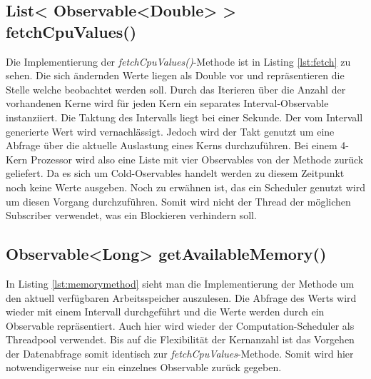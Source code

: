 \subsection{List< Observable<Double> > fetchCpuValues()}
 
Die Implementierung der \textit{fetchCpuValues()}-Methode ist in Listing \ref{lst:fetch} zu sehen. Die sich ändernden Werte liegen als Double vor und repräsentieren die Stelle welche beobachtet werden soll. Durch das Iterieren über die Anzahl der vorhandenen Kerne wird für jeden Kern ein separates Interval-Observable instanziiert. Die Taktung des Intervalls liegt bei einer Sekunde. Der vom Intervall generierte Wert wird vernachlässigt. Jedoch wird der Takt genutzt um eine Abfrage über die aktuelle Auslastung eines Kerns durchzuführen. Bei einem 4-Kern Prozessor wird also eine Liste mit vier Observables von der Methode zurück geliefert. Da es sich um Cold-Oservables handelt werden zu diesem Zeitpunkt noch keine Werte ausgeben. Noch zu erwähnen ist, das ein Scheduler genutzt wird um diesen Vorgang durchzuführen. Somit wird nicht der Thread der möglichen Subscriber verwendet, was ein Blockieren verhindern soll. 
\subsection{Observable<Long> getAvailableMemory()}
In Listing \ref{lst:memorymethod} sieht man die Implementierung der Methode um den aktuell verfügbaren Arbeitsspeicher auszulesen. Die Abfrage des Werts wird wieder mit einem Intervall durchgeführt und die Werte werden durch ein Observable repräsentiert. Auch hier wird wieder der Computation-Scheduler als Threadpool verwendet. Bis auf die Flexibilität der Kernanzahl ist das Vorgehen der Datenabfrage somit identisch zur \textit{fetchCpuValues}-Methode. Somit wird hier notwendigerweise nur ein einzelnes Observable zurück gegeben.
 \newpage
